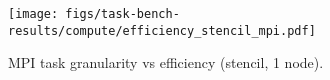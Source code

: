 \begin{figure}[t]
\centering
\texttt{[image: figs/task-bench-results/compute/efficiency\_stencil\_mpi.pdf]}
\vspace{-0.5cm}
\caption{MPI task granularity vs efficiency (stencil, 1 node).\label{fig:efficiency-mpi}}
\vspace{-0.05cm}
\end{figure}

